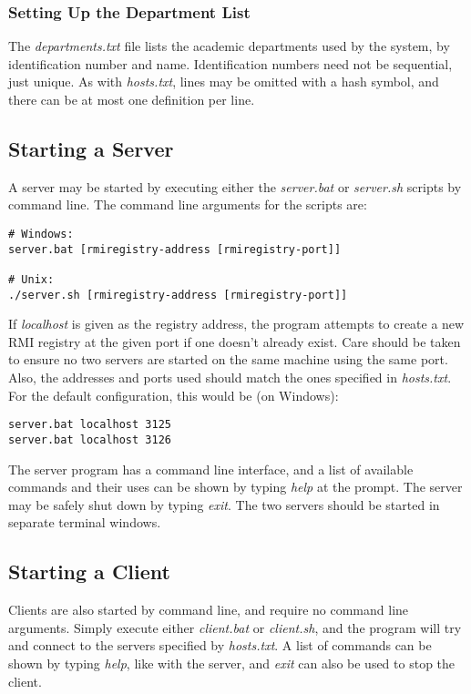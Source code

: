 \documentclass[a4paper,11pt]{article}
\begin{document}
\subsubsection{Setting Up the Department List}
The \emph{departments.txt} file lists the academic departments used by the system, by identification number and name. Identification numbers need not be sequential, just unique. As with \emph{hosts.txt}, lines may be omitted with a hash symbol, and there can be at most one definition per line.

\subsection{Starting a Server}
A server may be started by executing either the \emph{server.bat} or \emph{server.sh} scripts by command line. The command line arguments for the scripts are:

\begin{verbatim}
# Windows:
server.bat [rmiregistry-address [rmiregistry-port]]

# Unix:
./server.sh [rmiregistry-address [rmiregistry-port]]
\end{verbatim}

\noindent
If \emph{localhost} is given as the registry address, the program attempts to create a new RMI registry at the given port if one doesn't already exist. Care should be taken to ensure no two servers are started on the same machine using the same port. Also, the addresses and ports used should match the ones specified in \emph{hosts.txt}. For the default configuration, this would be (on Windows):

\begin{verbatim}
server.bat localhost 3125
server.bat localhost 3126
\end{verbatim}

\noindent
The server program has a command line interface, and a list of available commands and their uses can be shown by typing \emph{help} at the prompt. The server may be safely shut down by typing \emph{exit}. The two servers should be started in separate terminal windows.

\subsection{Starting a Client}
Clients are also started by command line, and require no command line arguments. Simply execute either \emph{client.bat} or \emph{client.sh}, and the program will try and connect to the servers specified by \emph{hosts.txt}. A list of commands can be shown by typing \emph{help}, like with the server, and \emph{exit} can also be used to stop the client.
\end{document}
